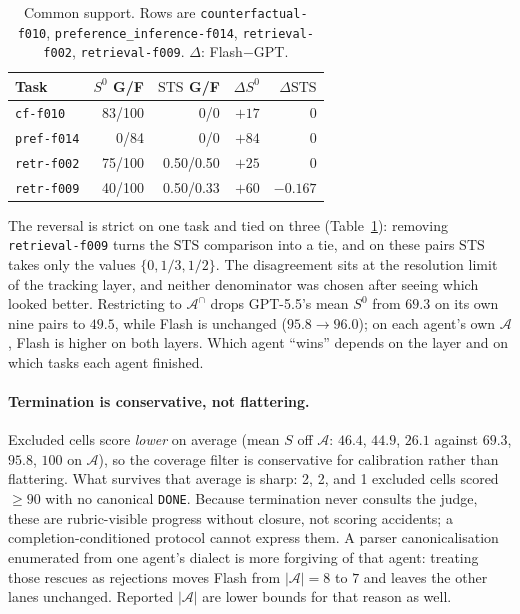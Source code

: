 \documentclass[sigconf,anonymous]{aamas}
\newcommand{\task}[1]{\texttt{#1}}
\newcommand{\A}{\mathcal{A}}
\newcommand{\Acap}{\mathcal{A}^{\cap}}
\newcommand{\STS}{\mathrm{STS}}
\begin{document}
\begin{table}[t]
\centering
\caption{Common support. Rows are \task{counterfactual-f010}, \task{preference\_inference-f014}, \task{retrieval-f002}, \task{retrieval-f009}. $\Delta$: Flash$-$GPT.}
\label{tab:pertask}
\small
\begin{tabular}{lrrrr}
\toprule
Task & $S^{0}$ G/F & $\STS$ G/F & $\Delta S^{0}$ & $\Delta\STS$ \\
\midrule
\task{cf-f010}   & 83/100 & 0/0       & $+17$ & $0$ \\
\task{pref-f014} & 0/84   & 0/0       & $+84$ & $0$ \\
\task{retr-f002} & 75/100 & 0.50/0.50 & $+25$ & $0$ \\
\task{retr-f009} & 40/100 & 0.50/0.33 & $+60$ & $-0.167$ \\
\bottomrule
\end{tabular}
\end{table}

The reversal is strict on one task and tied on three (Table~\ref{tab:pertask}): removing \task{retrieval-f009} turns the $\STS$ comparison into a tie, and on these pairs $\STS$ takes only the values $\{0,1/3,1/2\}$.
The disagreement sits at the resolution limit of the tracking layer, and neither denominator was chosen after seeing which looked better.
Restricting to $\Acap$ drops GPT-5.5's mean $S^{0}$ from $69.3$ on its own nine pairs to $49.5$, while Flash is unchanged ($95.8\to96.0$); on each agent's own $\A$, Flash is higher on both layers.
Which agent ``wins'' depends on the layer and on which tasks each agent finished.

\paragraph{Termination is conservative, not flattering.}
Excluded cells score \emph{lower} on average (mean $S$ off $\A$: $46.4$, $44.9$, $26.1$ against $69.3$, $95.8$, $100$ on $\A$), so the coverage filter is conservative for calibration rather than flattering.
What survives that average is sharp: 2, 2, and 1 excluded cells scored $\ge90$ with no canonical \texttt{DONE}.
Because termination never consults the judge, these are rubric-visible progress without closure, not scoring accidents; a completion-conditioned protocol cannot express them.
A parser canonicalisation enumerated from one agent's dialect is more forgiving of that agent: treating those rescues as rejections moves Flash from $|\A|=8$ to $7$ and leaves the other lanes unchanged.
Reported $|\A|$ are lower bounds for that reason as well.
\end{document}
